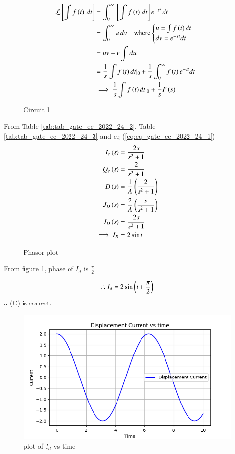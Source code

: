 \documentclass[journal,12pt,twocolumn]{IEEEtran}
\begin{document}
\begin{align}
    \mathcal{L}{}\left[\int f\left(t\right)\, dt\right] &= \int_{0}^{\infty}{}\left[\int f\left(t\right)\, dt\right]e^{-st}\, dt\\
    &= \int_{0}^{\infty}u\, dv \quad \text{where}\begin{cases}
  u =\int f\left(t\right)dt \\
  dv  =e^{-st}dt
\end{cases}\\
&= uv - v\int du\\
&= \frac{1}{s}\int f\left(t\right)dt|_0 + \frac{1}{s}\int_{0}^{\infty}f\left(t\right)e^{-st}dt\\
&\implies \frac{1}{s}\int f\left(t\right)dt|_0 + \frac{1}{s}F\left(s\right) \label{eq:eq_gate_ec_2022_24_1}
\end{align}


\begin{figure}[ht]
  \centering
      
  \caption{Circuit 1}
\end{figure}

From Table \ref{tab:tab_gate_ec_2022_24_2}, Table \ref{tab:tab_gate_ec_2022_24_3} and eq (\ref{eq:eq_gate_ec_2022_24_1})
\begin{align}
    I_c\left(s\right) &= \frac{2s}{s^2 + 1}\\
    Q_c\left(s\right) &= \frac{2}{s^2 + 1}\\
    D\left(s\right) &= \frac{1}{A}\left(\frac{2}{s^2 + 1}\right)\\
    J_D\left(s\right) &= \frac{2}{A}\left(\frac{s}{s^2 + 1}\right)\\
    I_D\left(s\right) &= \frac{2s}{s^2 + 1}\\
    \implies I_D &= 2\sin{t}
\end{align}


\begin{figure}[ht]
  \centering
      
  \caption{Phasor plot}
  \label{fig:fig_gate_ec_2022_24_1}
\end{figure}

From figure \ref{fig:fig_gate_ec_2022_24_1}, phase of $I_d$ is $\frac{\pi}{2}$

\begin{align}
    \therefore I_d = 2\sin\left(t + \frac{\pi}{2}\right)
\end{align}
$\therefore$ (C) is correct.

\begin{figure}[ht]
    \centering
    \includegraphics[width=\columnwidth]{figs/Figure_1.png}
    \caption{plot of $I_d$ vs time}
    \label{fig:fig_gate_ec_2022_24_2}
\end{figure}
\end{document}

